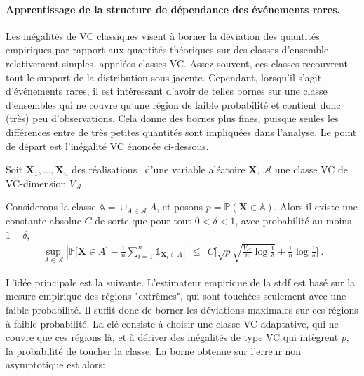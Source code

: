 \paragraph{Apprentissage de la structure de dépendance des événements rares.}
Les inégalités de VC classiques visent à borner la déviation des quantités empiriques par rapport aux quantités théoriques sur des classes d'ensemble relativement simples, appelées classes VC. Assez souvent, ces classes recouvrent tout le support de la distribution sous-jacente. Cependant, lorsqu'il s'agit d'événements rares, il est intéressant d'avoir de telles bornes sur une classe d'ensembles qui ne couvre qu'une région de faible probabilité et contient donc (très) peu d'observations. Cela donne des bornes plus fines, puisque seules les différences entre de très petites quantités sont impliquées dans l'analyse. Le point de départ est l'inégalité VC énoncée ci-dessous. %

\begin{theoreme}
\label{resume_fr:thm-princ} 
Soit $\mathbf{X}_1,\ldots,\mathbf{X}_n$ des réalisations \iid~d'une variable aléatoire $\mathbf{X}$, $\mathcal{A}$  une classe VC de VC-dimension $V_{\mathcal{A}}$. 

Considerons la classe $\mathbb{A} = \cup_{A \in \mathcal{A}} A$, et posons $p = \mathbb{P}(\mathbf{X} \in \mathbb{A})$. 
Alors il existe une constante absolue $ C $ de sorte que pour tout $ 0 <\delta <1 $, avec probabilité au moins $ 1- \delta $,
\begin{align*}
\sup_{A \in \mathcal{A}} \left| \mathbb{P} \big[\mathbf{X} \in A\big] - \frac{1}{n} \sum_{i=1}^n \mathds{1}_{\mathbf{X}_i \in A}  \right| ~~\le~~ C \bigg[ \sqrt{p}\sqrt{\frac{V_{\mathcal{A}}}{n} \log{\frac{1}{\delta}}} + \frac{1}{n} \log{\frac{1}{\delta}} \bigg]~.
\end{align*}
\end{theoreme}

L'idée principale est la suivante. L'estimateur empirique de la {\sc stdf} est basé sur la mesure empirique des régions "extrêmes", qui sont touchées seulement avec une faible probabilité. Il suffit donc de borner les déviations maximales sur ces régions à faible probabilité.
La clé consiste à choisir une classe VC adaptative, qui ne couvre que ces régions là, et à dériver des inégalités de type VC qui intègrent $p$, la probabilité de toucher la classe. La borne obtenue sur l'erreur non asymptotique est alors:

